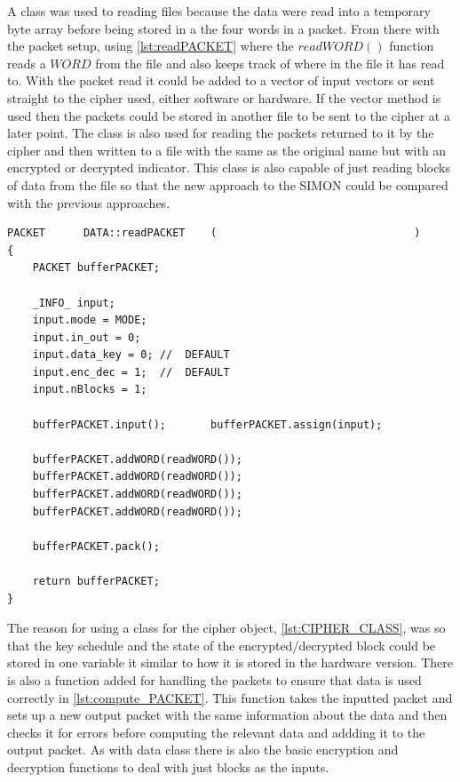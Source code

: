 \documentclass[12pt,twoside,a4paper]{report}
\begin{document}
   	A class was used to reading files because the data were read into a temporary byte array before being stored in a the four words in a packet. From there with the packet setup, using \autoref{lst:readPACKET} where the $readWORD()$ function reads a $WORD$ from the file and also keeps track of where in the file it has read to. With the packet read it could be added to a vector of input vectors or sent straight to the cipher used, either software or hardware. If the vector method is used then the packets could be stored in another file to be sent to the cipher at a later point. The class is also used for reading the packets returned to it by the cipher and then written to a file with the same as the original name but with an encrypted or decrypted indicator. This class is also capable of just reading blocks of data from the file so that the new approach to the SIMON could be compared with the previous approaches.

 	\begin{minipage}{\linewidth}
	\begin{lstlisting}[label={lst:readPACKET},caption={Function used for reading a packet},style=CStyle]	
PACKET		DATA::readPACKET	(								)
{
	PACKET bufferPACKET;
	
	_INFO_ input;
	input.mode = MODE;
	input.in_out = 0;
	input.data_key = 0;	//	DEFAULT
	input.enc_dec = 1;	//	DEFAULT
	input.nBlocks = 1;
	
	bufferPACKET.input();		bufferPACKET.assign(input);
	
	bufferPACKET.addWORD(readWORD());
	bufferPACKET.addWORD(readWORD());
	bufferPACKET.addWORD(readWORD());
	bufferPACKET.addWORD(readWORD());
	
	bufferPACKET.pack();
	
	return bufferPACKET;
}
	\end{lstlisting}
	\end{minipage}
	
	The reason for using a class for the cipher object, \autoref{lst:CIPHER_CLASS}, was so that the key schedule and the state of the encrypted/decrypted block could be stored in one variable it similar to how it is stored in the hardware version. There is also a function added for handling the packets to ensure that data is used correctly in \autoref{lst:compute_PACKET}. This function takes the inputted packet and sets up a new output packet with the same information about the data and then checks it for errors before computing the relevant data and addding it to the output packet. As with data class there is also the basic encryption and decryption functions to deal with just blocks as the inputs.
	
\end{document}
